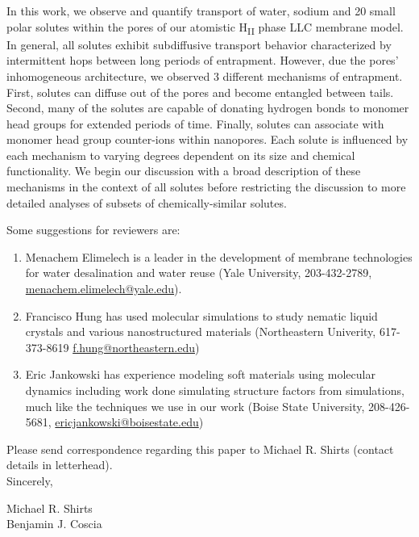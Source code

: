 \documentclass[fontsize=11pt]{article}
\begin{document}
	In this work, we observe and quantify transport of water, sodium and 20 small
	polar solutes within the pores of our atomistic H\textsubscript{II} phase LLC membrane
	model. In general, all solutes exhibit subdiffusive transport behavior
	characterized by intermittent hops between long periods of entrapment. However, 
	due the pores' inhomogeneous architecture, we observed 3 different mechanisms
	of entrapment. First, solutes can diffuse out of the pores and become entangled 
	between tails. Second, many of the solutes are capable of donating hydrogen bonds
	to monomer head groups for extended periods of time. Finally, solutes can associate
	with monomer head group counter-ions within nanopores. Each solute is influenced 
	by each mechanism to varying degrees dependent on its size and chemical 
	functionality. We begin our discussion with a broad description of these mechanisms
	in the context of all solutes before restricting the discussion to more detailed 
	analyses of subsets of chemically-similar solutes. 
	
	\noindent Some suggestions for reviewers are:
	\begin{enumerate}

		\item Menachem Elimelech is a leader in the development of membrane technologies
		for	water desalination and water reuse (Yale University, 203-432-2789,
		\href{mailto:menachem.elimelech@yale.edu}{menachem.elimelech@yale.edu}).
	
		\item Francisco Hung has used molecular simulations to study nematic liquid crystals
		and various	nanostructured materials (Northeastern Univerity, 617-373-8619 	
		\href{mailto:f.hung@northeastern.edu}{f.hung@northeastern.edu})
		
		\item Eric Jankowski has experience modeling soft materials using molecular dynamics
		including work done simulating structure factors from simulations, much like
		the techniques we use in our work (Boise State University, 208-426-5681,
		\href{mailto:ericjankowski@boisestate.edu}{ericjankowski@boisestate.edu})
		
	\end{enumerate}
	
	\noindent Please send correspondence regarding this paper to Michael R. Shirts (contact
	details in letterhead).\\	
	
	\noindent Sincerely,
	
	\noindent Michael R. Shirts \\
	\noindent Benjamin J. Coscia \\
	
\end{document}
